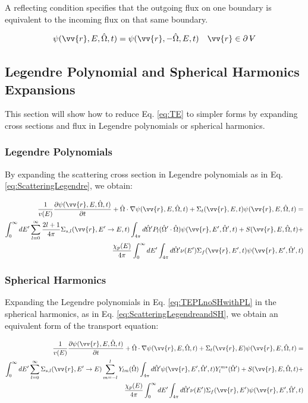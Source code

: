 \documentclass[10pt]{article}
\newcommand{\beq}{\begin{equation}}
\newcommand{\eeq}{\end{equation}}
\newcommand{\beqa}{\begin{equation}\begin{aligned}}
\newcommand{\eeqa}{\end{aligned}\end{equation}}
\newcommand{\hO}{\hat{\Omega}}
\newcommand{\spa}{(\vv{r}, E, \hO, t)}
\newcommand{\spas}{(\vv{r},E,t)}
\newcommand{\spap}{(\vv{r}, E', \hO',t)}
\newcommand{\spaps}{(\vv{r},E',t)}
\newcounter{subsubsubsection}[subsubsection]
\newcommand{\volume}{\mathop{\ooalign{\hfil$V$\hfil\cr\kern0.08em--\hfil\cr}}\nolimits}
\begin{document}
\begin{flushleft}
A reflecting condition specifies that the outgoing flux on one boundary is equivalent to the incoming flux on that same boundary.

\beq
\psi\spa =\psi(\vv{r},-\hO  ,E,t)\quad\vv{r}\in\partial \volume
\eeq

\subsection{Legendre Polynomial and Spherical Harmonics Expansions}
This section will show how to reduce Eq. \eqref{eq:TE} to simpler forms by expanding cross sections and flux in Legendre polynomials or spherical harmonics.

\subsubsection{Legendre Polynomials}

By expanding the scattering cross section in Legendre polynomials as in Eq. \ref{eq:ScatteringLegendre}, we obtain:

\beqa
\label{eq:TEPLnoSHwithPL}
\frac{1}{v(E)} \frac{\partial\psi\spa }{\partial t} +
 \hO  \cdot\nabla\psi\spa  + 
 \Sigma_t\spas\psi\spa  = \\
 \int_{0}^{\infty}dE' \sum_{l=0}^{\infty} \frac{2l+1}{4\pi}\Sigma_{s,l}(\vv{r}, E'\rightarrow E,t) \int_{4\pi}^{} d\hO  'P_l(\hO  '\cdot\hO  )\psi\spap + S\spa +\\
  \frac{\chi_p(E)}{4\pi} \int_{0}^{\infty} dE'\int_{4\pi}^{} d\hO  '\nu(E')\Sigma_f\spaps\psi\spap\\
\eeqa

\subsubsection{Spherical Harmonics}

Expanding the Legendre polynomials in Eq. \eqref{eq:TEPLnoSHwithPL} in the spherical harmonics, as in Eq. \ref{eq:ScatteringLegendreandSH}, we obtain an equivalent form of the transport equation:

\begin{equation}
\label{eq:TEPLnomoments}
\begin{aligned}
\frac{1}{v(E)} \frac{\partial\psi\spa }{\partial t} +
 \hO  \cdot\nabla\psi\spa  + 
 \Sigma_t(\vv{r},E)\psi\spa  = \\
 \int_{0}^{\infty}dE' \sum_{l=0}^{\infty} \Sigma_{s,l}(\vv{r}, E'\rightarrow E) \sum_{m=-l}^{l} Y_{lm}(\hO  )\int_{4\pi}^{} d\hO  '\psi(\vv{r}, E', \hO  ', t)Y_l^{m*}(\hO  ') + S\spa +\\
 \frac{\chi_p(E)}{4\pi} \int_{0}^{\infty} dE'\int_{4\pi}^{} d\hO  '\nu(E')\Sigma_f(\vv{r}, E')\psi\spap\\
\end{aligned}
\end{equation}


\end{flushleft}
\end{document}
